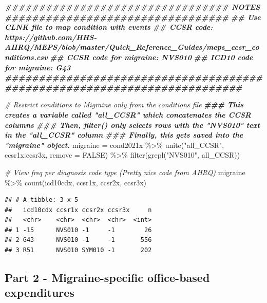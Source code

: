 \documentclass[
]{book}
\newenvironment{Shaded}{\begin{snugshade}}{\end{snugshade}}
\newcommand{\AttributeTok}[1]{\textcolor[rgb]{0.77,0.63,0.00}{#1}}
\newcommand{\CommentTok}[1]{\textcolor[rgb]{0.56,0.35,0.01}{\textit{#1}}}
\newcommand{\ConstantTok}[1]{\textcolor[rgb]{0.00,0.00,0.00}{#1}}
\newcommand{\DocumentationTok}[1]{\textcolor[rgb]{0.56,0.35,0.01}{\textbf{\textit{#1}}}}
\newcommand{\FunctionTok}[1]{\textcolor[rgb]{0.00,0.00,0.00}{#1}}
\newcommand{\NormalTok}[1]{#1}
\newcommand{\OtherTok}[1]{\textcolor[rgb]{0.56,0.35,0.01}{#1}}
\newcommand{\SpecialCharTok}[1]{\textcolor[rgb]{0.00,0.00,0.00}{#1}}
\newcommand{\StringTok}[1]{\textcolor[rgb]{0.31,0.60,0.02}{#1}}
\begin{document}
\begin{Shaded}
\begin{Highlighting}[]
\DocumentationTok{\#\#\#\#\#\#\#\#\#\#\#\#\#\#\#\#\#\#\#\#\#\#\#\#\#\#\#\#\#\#\#\#\# NOTES \#\#\#\#\#\#\#\#\#\#\#\#\#\#\#\#\#\#\#\#\#\#\#\#\#\#\#\#\#\#\#\#\# }
\DocumentationTok{\#\# Use CLNK file to map condition with events}
\DocumentationTok{\#\# CCSR code: https://github.com/HHS{-}AHRQ/MEPS/blob/master/Quick\_Reference\_Guides/meps\_ccsr\_conditions.csv}
\DocumentationTok{\#\# CCSR code for migraine: NVS010}
\DocumentationTok{\#\# ICD10 code for migraine: G43}
\DocumentationTok{\#\#\#\#\#\#\#\#\#\#\#\#\#\#\#\#\#\#\#\#\#\#\#\#\#\#\#\#\#\#\#\#\#\#\#\#\#\#\#\#\#\#\#\#\#\#\#\#\#\#\#\#\#\#\#\#\#\#\#\#\#\#\#\#\#\#\#\#\#\#\#\#\# }

\CommentTok{\# Restrict conditions to Migraine only from the conditions file}
\DocumentationTok{\#\#\# This creates a variable called "all\_CCSR" which concatenates the CCSR columns}
\DocumentationTok{\#\#\# Then, filter() only selects rows with the "NVS010" text in the "all\_CCSR" column}
\DocumentationTok{\#\#\# Finally, this gets saved into the "migraine" object.}
\NormalTok{migraine }\OtherTok{=}\NormalTok{ cond2021x }\SpecialCharTok{\%\textgreater{}\%} 
  \FunctionTok{unite}\NormalTok{(}\StringTok{"all\_CCSR"}\NormalTok{, ccsr1x}\SpecialCharTok{:}\NormalTok{ccsr3x, }\AttributeTok{remove =} \ConstantTok{FALSE}\NormalTok{) }\SpecialCharTok{\%\textgreater{}\%} 
  \FunctionTok{filter}\NormalTok{(}\FunctionTok{grepl}\NormalTok{(}\StringTok{"NVS010"}\NormalTok{, all\_CCSR))}


\CommentTok{\# View freq per diagnosis code type (Pretty nice code from AHRQ)}
\NormalTok{migraine }\SpecialCharTok{\%\textgreater{}\%} 
  \FunctionTok{count}\NormalTok{(icd10cdx, ccsr1x, ccsr2x, ccsr3x) }
\end{Highlighting}
\end{Shaded}

\begin{verbatim}
## # A tibble: 3 x 5
##   icd10cdx ccsr1x ccsr2x ccsr3x     n
##   <chr>    <chr>  <chr>  <chr>  <int>
## 1 -15      NVS010 -1     -1        26
## 2 G43      NVS010 -1     -1       556
## 3 R51      NVS010 SYM010 -1       202
\end{verbatim}

\hypertarget{part-2---migraine-specific-office-based-expenditures}{%
\subsection{Part 2 - Migraine-specific office-based expenditures}\label{part-2---migraine-specific-office-based-expenditures}}
\end{document}
